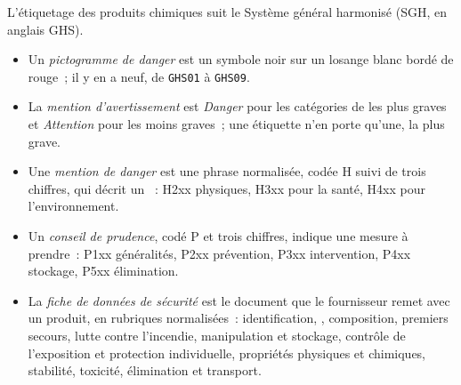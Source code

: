 \begin{definition}\label{def:b1:lab-techniques-1:ghs}
L'étiquetage des produits chimiques suit le Système général harmonisé
(SGH, en anglais GHS).
\begin{itemize}
  \item Un \emph{pictogramme de danger} est
        un symbole noir sur un losange blanc bordé de rouge~; il y en a
        neuf, de \texttt{GHS01} à \texttt{GHS09}.
  \item La \emph{mention d'avertissement}
        est \emph{Danger} pour les catégories de  les plus graves et
        \emph{Attention} pour les moins graves~; une étiquette n'en porte
        qu'une, la plus grave.
  \item Une \emph{mention de danger} est une
        phrase normalisée, codée H suivi de trois chiffres, qui décrit un
        ~: H2xx  physiques, H3xx  pour la santé, H4xx
         pour l'environnement.
  \item Un \emph{conseil de prudence}, codé P
        et trois chiffres, indique une mesure à prendre~: P1xx généralités,
        P2xx prévention, P3xx intervention, P4xx stockage, P5xx
        élimination.
  \item La \emph{fiche de données de sécurité}
        est le document que le fournisseur remet avec un produit, en
        rubriques normalisées~: identification, , composition,
        premiers secours, lutte contre l'incendie, manipulation et
        stockage, contrôle de l'exposition et protection individuelle,
        propriétés physiques et chimiques, stabilité, toxicité,
        élimination et transport.
\end{itemize}
\end{definition}

